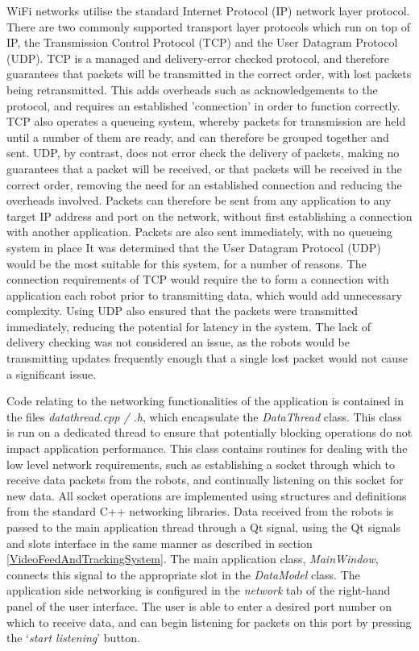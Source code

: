 WiFi networks utilise the standard Internet Protocol (IP) network layer protocol. There are two commonly supported transport layer protocols which run on top of IP, the Transmission Control Protocol (TCP) and the User Datagram Protocol (UDP). TCP is a managed and delivery-error checked protocol, and therefore guarantees that packets will be transmitted in the correct order, with lost packets being retransmitted. This adds overheads such as acknowledgements to the protocol, and requires an established 'connection' in order to function correctly. TCP also operates a queueing system, whereby packets for transmission are held until a number of them are ready, and can therefore be grouped together and sent. UDP, by contrast, does not error check the delivery of packets, making no guarantees that a packet will be received, or that packets will be received in the correct order, removing the need for an established connection and reducing the overheads involved. Packets can therefore be sent from any application to any target IP address and port on the network, without first establishing a connection with another application. Packets are also sent immediately, with no queueing system in place It was determined that the User Datagram Protocol (UDP) would be the most suitable for this system, for a number of reasons. The connection requirements of TCP would require the to form a connection with application each robot prior to transmitting data, which would add unnecessary complexity. Using UDP also ensured that the packets were transmitted immediately, reducing the potential for latency in the system. The lack of delivery checking was not considered an issue, as the robots would be transmitting updates frequently enough that a single lost packet would not cause a significant issue.

Code relating to the networking functionalities of the application is contained in the files \textit{datathread.cpp / .h}, which encapsulate the \textit{DataThread} class. This class is run on a dedicated thread to ensure that potentially blocking operations do not impact application performance. This class contains routines for dealing with the low level network requirements, such as establishing a socket through which to receive data packets from the robots, and continually listening on this socket for new data. All socket operations are implemented using structures and definitions from the standard C++ networking libraries. Data received from the robots is passed to the main application thread through a Qt signal, using the Qt signals and slots interface in the same manner as described in section \ref{VideoFeedAndTrackingSystem}. The main application class, \textit{MainWindow}, connects this signal to the appropriate slot in the \textit{DataModel} class. The application side networking is configured in the \textit{network} tab of the right-hand panel of the user interface. The user is able to enter a desired port number on which to receive data, and can begin listening for packets on this port by pressing the `\textit{start listening}' button.


